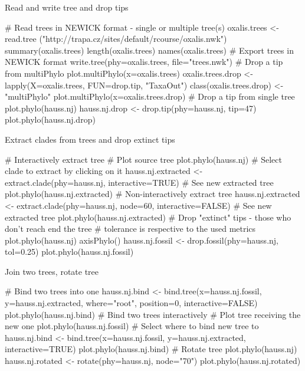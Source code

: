 \documentclass[compress, ucs, xelatex, 11pt, xcolor=svgnames,
  hyperref={
    bookmarks=true,
    unicode=true,
    colorlinks=true,
    pdftitle={Molecular data in R},
    plainpages=false,
    pdfauthor={Vojtech Zeisek},
    pdfsubject={Course about phylogeny and evolution in R},
    pdfcreator={XeLaTeX},
    pdfkeywords={R, evolution, phylogeny, molecular data},
    linkcolor=Tomato,
    anchorcolor=SaddleBrown,
    citecolor=Goldenrod,
    filecolor=DarkMagenta,
    menucolor=Sienna,
    urlcolor=DarkTurquoise,
    pdftex},
  url={hyphens, lowtilde} %
  ]{beamer}
\begin{document}
\begin{frame}[fragile]{Read and write tree and drop tips}
  \begin{spluscode}
    # Read trees in NEWICK format - single or multiple tree(s)
    oxalis.trees <- read.tree
      ("http://trapa.cz/sites/default/rcourse/oxalis.nwk")
    summary(oxalis.trees)
    length(oxalis.trees)
    names(oxalis.trees)
    # Export trees in NEWICK format
    write.tree(phy=oxalis.trees, file="trees.nwk")
    # Drop a tip from multiPhylo
    plot.multiPhylo(x=oxalis.trees)
    oxalis.trees.drop <- lapply(X=oxalis.trees, FUN=drop.tip, "TaxaOut")
    class(oxalis.trees.drop) <- "multiPhylo"
    plot.multiPhylo(x=oxalis.trees.drop)
    # Drop a tip from single tree
    plot.phylo(hauss.nj)
    hauss.nj.drop <- drop.tip(phy=hauss.nj, tip=47)
    plot.phylo(hauss.nj.drop)
  \end{spluscode}
\end{frame}

\begin{frame}[fragile]{Extract clades from trees and drop extinct tips}
  \begin{spluscode}
    # Interactively extract tree
    # Plot source tree
    plot.phylo(hauss.nj)
    # Select clade to extract by clicking on it
    hauss.nj.extracted <- extract.clade(phy=hauss.nj, interactive=TRUE)
    # See new extracted tree
    plot.phylo(hauss.nj.extracted)
    # Non-interactively extract tree
    hauss.nj.extracted <- extract.clade(phy=hauss.nj, node=60,
      interactive=FALSE)
    # See new extracted tree
    plot.phylo(hauss.nj.extracted)
    # Drop "extinct" tips - those who don't reach end the tree
    # tolerance is respective to the used metrics
    plot.phylo(hauss.nj)
    axisPhylo()
    hauss.nj.fossil <- drop.fossil(phy=hauss.nj, tol=0.25)
    plot.phylo(hauss.nj.fossil)
  \end{spluscode}
\end{frame}

\begin{frame}[fragile]{Join two trees, rotate tree}
  \begin{spluscode}
    # Bind two trees into one
    hauss.nj.bind <- bind.tree(x=hauss.nj.fossil, y=hauss.nj.extracted,
      where="root", position=0, interactive=FALSE)
    plot.phylo(hauss.nj.bind)
    # Bind two trees interactively
    # Plot tree receiving the new one
    plot.phylo(hauss.nj.fossil)
    # Select where to bind new tree to
    hauss.nj.bind <- bind.tree(x=hauss.nj.fossil, y=hauss.nj.extracted,
      interactive=TRUE)
    plot.phylo(hauss.nj.bind)
    # Rotate tree
    plot.phylo(hauss.nj)
    hauss.nj.rotated <- rotate(phy=hauss.nj, node="70")
    plot.phylo(hauss.nj.rotated)
  \end{spluscode}
\end{frame}
\end{document}

